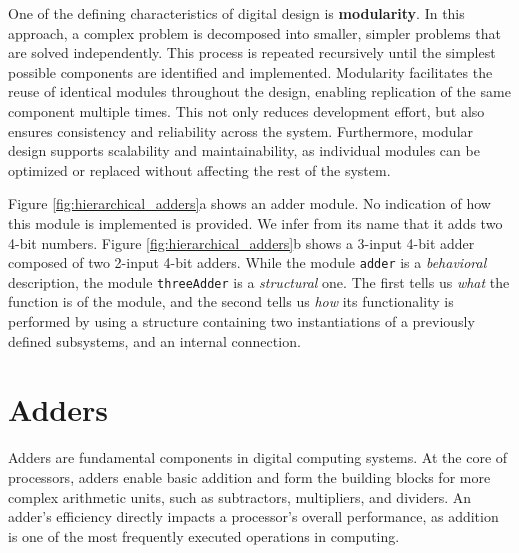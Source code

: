 One of the defining characteristics of digital design is \textbf{modularity}. In this approach, a complex problem is decomposed into smaller, simpler problems that are solved independently. This process is repeated recursively until the simplest possible components are identified and implemented. Modularity facilitates the reuse of identical modules throughout the design, enabling replication of the same component multiple times. This not only reduces development effort, but also ensures consistency and reliability across the system. Furthermore, modular design supports scalability and maintainability, as individual modules can be optimized or replaced without affecting the rest of the system.


Figure \ref{fig:hierarchical_adders}a shows an adder module. No indication of how this module is implemented is provided. We infer from its name that it adds two 4-bit numbers. Figure \ref{fig:hierarchical_adders}b shows a 3-input 4-bit adder composed of two 2-input 4-bit adders. While the module {\tt adder} is a {\em behavioral} description,
the module {\tt threeAdder} is a {\em structural} one. The first
tells us {\em what} the function is of the module, and the second
tells us {\em how} its functionality is performed by using a
structure containing two instantiations of a previously defined
subsystems, and an internal connection.




\section{Adders}
Adders are fundamental components in digital computing systems. At the core of processors, adders enable basic addition and form the building blocks for more complex arithmetic units, such as subtractors, multipliers, and dividers. An adder's efficiency directly impacts a processor's overall performance, as addition is one of the most frequently executed operations in computing.

